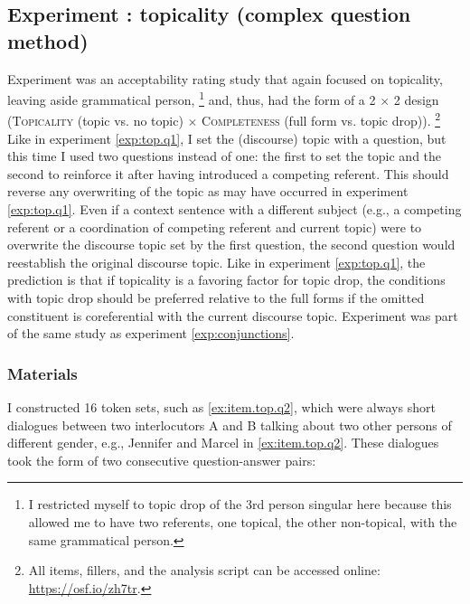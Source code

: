 \subsection{Experiment : topicality (complex question method) }
\label{sec:exp.top.q2}
Experiment  was an acceptability rating study that again focused on topicality, leaving aside grammatical person,%
\footnote{I restricted myself to topic drop of the 3rd person singular here because this allowed me to have two referents, one topical, the other non-topical, with the same grammatical person.}
%
and, thus, had the form of a 2 $\times$ 2 design (\textsc{Topicality} (topic vs. no topic) $\times$ \textsc{Completeness} (full form vs. topic drop)).%
\footnote{All items, fillers, and the analysis script can be accessed online: \url{https://osf.io/zh7tr}.}
%
Like in experiment \ref*{exp:top.q1}, I set the (discourse) topic with a question, but this time I used two questions instead of one:
the first to set the topic and the second to reinforce it after having introduced a competing referent.
This should reverse any overwriting of the topic as may have occurred in experiment \ref*{exp:top.q1}.
Even if a context sentence with a different subject (e.g., a competing referent or a coordination of competing referent and current topic) were to overwrite the discourse topic  set by the first question, the second question would reestablish the original discourse topic. 
Like in experiment \ref*{exp:top.q1}, the prediction is that if topicality is a favoring factor for topic drop, the conditions with topic drop should be preferred relative to the full forms if the omitted constituent is coreferential with the current discourse topic. 
Experiment  was part of the same study as experiment \ref*{exp:conjunctions}.

\largerpage
\subsubsection{Materials}
I constructed 16 token sets, such as \ref{ex:item.top.q2}, which were always short dialogues between two interlocutors A and B talking about two other persons of different gender, e.g., Jennifer and Marcel in \ref{ex:item.top.q2}.
These dialogues took the form of two consecutive question-answer pairs:

